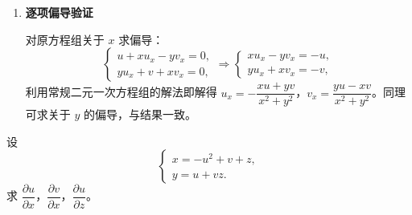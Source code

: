\documentclass[lang=cn,11pt]{elegantbook}
\begin{document}
\begin{solution}
\begin{enumerate}
  由 Cramer 法则解得：
  \begin{align*}
  \mathrm{d}u &= \frac{1}{J}\det\begin{pmatrix} -u\,\mathrm{d}x+v\,\mathrm{d}y & -y \\ -v\,\mathrm{d}x-u\,\mathrm{d}y & x \end{pmatrix} 
    = \frac{x(-u\,\mathrm{d}x+v\,\mathrm{d}y) - (-y)(-v\,\mathrm{d}x-u\,\mathrm{d}y)}{x^2+y^2} \\
    &= \frac{-(xu+yv)\,\mathrm{d}x + (xv-yu)\,\mathrm{d}y}{x^2+y^2}. \\[8pt]
  \mathrm{d}v &= \frac{1}{J}\det\begin{pmatrix} x & -u\,\mathrm{d}x+v\,\mathrm{d}y \\ y & -v\,\mathrm{d}x-u\,\mathrm{d}y \end{pmatrix}
    = \frac{x(-v\,\mathrm{d}x-u\,\mathrm{d}y) - y(-u\,\mathrm{d}x+v\,\mathrm{d}y)}{x^2+y^2} \\
    &= \frac{(yu-xv)\,\mathrm{d}x - (xu+yv)\,\mathrm{d}y}{x^2+y^2}.
  \end{align*}
  
  分别读取 $\mathrm{d}x$ 和 $\mathrm{d}y$ 的系数即可得到各偏导数：
  \begin{align*}
  \frac{\partial u}{\partial x} &= -\frac{xu+yv}{x^2+y^2}, & \frac{\partial u}{\partial y} &= \frac{xv-yu}{x^2+y^2}, \\
  \frac{\partial v}{\partial x} &= \frac{yu-xv}{x^2+y^2}, & \frac{\partial v}{\partial y} &= -\frac{xu+yv}{x^2+y^2}.
  \end{align*}

  \item[\textbf{方法二：}] \textbf{逐项偏导验证}
  
  对原方程组关于 $x$ 求偏导：
  \[
  \begin{cases}
  u+xu_x-yv_x=0,\\
  yu_x+v+xv_x=0,
  \end{cases}
  \Longrightarrow
  \begin{cases}
  xu_x-yv_x=-u,\\
  yu_x+xv_x=-v,
  \end{cases}
  \]
  利用常规二元一次方程组的解法即解得 $u_x=-\dfrac{xu+yv}{x^2+y^2}$，$v_x=\dfrac{yu-xv}{x^2+y^2}$。同理可求关于 $y$ 的偏导，与结果一致。
\end{enumerate}
\end{solution}

\begin{exercise}[非线性方程组的隐函数] \label{ex:implicit-system2}
设
\[
\begin{cases}
x=-u^2+v+z,\\
y=u+vz.
\end{cases}
\]
求 $\dfrac{\partial u}{\partial x}$，$\dfrac{\partial v}{\partial x}$，$\dfrac{\partial u}{\partial z}$。
\end{exercise}
\end{document}
